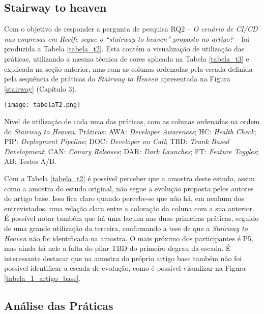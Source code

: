 \subsection{Stairway to heaven}

Com o objetivo de responder a pergunta de pesquisa RQ2 -- \emph{O cenário de CI/CD nas empresas em Recife segue o ``stairway to heaven'' proposto no artigo?} -- foi produzida a Tabela \ref{tabela_t2}. Esta contém a visualização de utilização das práticas, utilizando a mesma técnica de cores aplicada na Tabela \ref{tabela_t3} e explicada na seção anterior, mas com as colunas ordenadas pela escada definida pela sequência de práticas do \emph{Stairway to Heaven} apresentada na Figura \ref{stairway} (Capítulo 3).

\begin{table}[ht]
\begin{center}
\texttt{[image: tabelaT2.png]}
\end{center}
\caption[Nível de utilização das práticas, com as colunas na ordem do \emph{Stairway to Heaven}]{
    Nível de utilização de cada uma das práticas, com as colunas ordenadas na ordem do \emph{Stairway to Heaven}. Práticas: AWA: \emph{Developer Awareness}; HC: \emph{Health Check}; PIP: \emph{Deployment Pipeline}; DOC: \emph{Developer on Call}; TBD: \emph{Trunk Based Development}; CAN: \emph{Canary Releases}; DAR: \emph{Dark Launches}; FT: \emph{Feature Toggles}; AB: Testes A/B.
}\label{tabela_t2}
\end{table}

Com a Tabela \ref{tabela_t2} é possível perceber que a amostra deste estudo, assim como a amostra do estudo original, não segue a evolução proposta pelos autores do artigo base. Isso fica claro quando percebe-se que não há, em nenhum dos entrevistados, uma relação clara entre a coloração da coluna com a sua anterior. É possível notar também que há uma lacuna nas duas primeiras práticas, seguido de uma grande utilização da terceira, confirmando a tese de que a \emph{Stairway to Heaven} não foi identificada na amostra. O mais próximo dos participantes é P5, mas ainda há nele a falta do pilar TBD do primeiro degrau da escada. É interessante destacar que na amostra do próprio artigo base também não foi possível identificar a escada de evolução, como é possível visualizar na Figura \ref{tabela_1_artigo_base}.

\subsection{Análise das Práticas}

